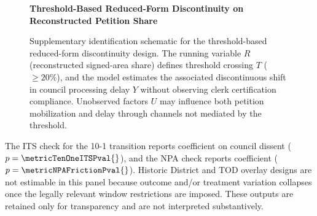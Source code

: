 \documentclass[11pt, letterpaper]{article}
\begin{document}
\begin{figure}[H]
\centering
\vspace{0.2cm}
\textbf{\small Threshold-Based Reduced-Form Discontinuity on Reconstructed Petition Share}\par\vspace{0.3cm}
\caption[Identification Diagram: Threshold-Based Reduced-Form Discontinuity]{Supplementary identification schematic for the threshold-based reduced-form discontinuity design. The running variable $R$ (reconstructed signed-area share) defines threshold crossing $T$ ($\geq 20\%$), and the model estimates the associated discontinuous shift in council processing delay $Y$ without observing clerk certification compliance. Unobserved factors $U$ may influence both petition mobilization and delay through channels not mediated by the threshold.}
\label{fig:causal_dag_appendix}
\end{figure}

The ITS check for the 10-1 transition reports coefficient \metricTenOneITSCoeff{} on council dissent ($p=\metricTenOneITSPval{}$), and the NPA check reports coefficient \metricNPAFrictionCoeff{} ($p=\metricNPAFrictionPval{}$). Historic District and TOD overlay designs are not estimable in this panel because outcome and/or treatment variation collapses once the legally relevant window restrictions are imposed. These outputs are retained only for transparency and are not interpreted substantively.
\end{document}
